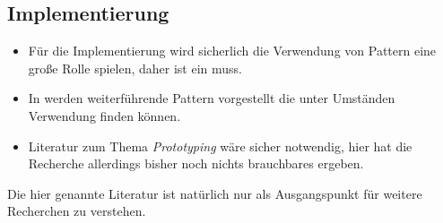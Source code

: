\documentclass[12pt,headsepline,a4paper,bibtotoc,liststotoc,DIV12,BCOR12mm]{scrartcl}
\begin{document}

\subsection{Implementierung} %
\label{sub:implementierung}

  \begin{itemize}
    \item Für die Implementierung wird sicherlich die Verwendung von Pattern eine große Rolle spielen, daher ist \citep{design_patterns} ein muss.
    \item In \citep{patterns_of_enterprise_application_architecture} werden weiterführende Pattern vorgestellt die unter Umständen Verwendung finden können.
    \item Literatur zum Thema \emph{Prototyping} wäre sicher notwendig, hier hat die Recherche allerdings bisher noch nichts brauchbares ergeben.
  \end{itemize}


  Die hier genannte Literatur ist natürlich nur als Ausgangspunkt für weitere Recherchen zu verstehen.



% 


\end{document}
